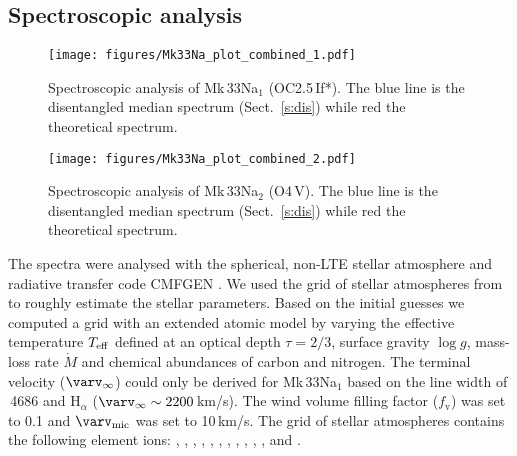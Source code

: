 \documentclass[fleqn,usenatbib]{mnras}
\begin{document}
\subsection{Spectroscopic analysis\label{s:sa}}

\begin{figure*}
	\texttt{[image: figures/Mk33Na\_plot\_combined\_1.pdf]}
    \caption{Spectroscopic analysis of Mk\,33Na$_1$ (OC2.5\,If*). The blue line is the disentangled median spectrum (Sect.~\ref{s:dis}) while red the theoretical spectrum.	\label{f:pri_dis}}
\end{figure*}

\begin{figure*}
	\texttt{[image: figures/Mk33Na\_plot\_combined\_2.pdf]}
    \caption{Spectroscopic analysis of Mk\,33Na$_2$ (O4\,V). The blue line is the disentangled median spectrum (Sect.~\ref{s:dis}) while red the theoretical spectrum.	\label{f:sec_dis}}
\end{figure*}


The spectra were analysed with the spherical, non-LTE stellar atmosphere and radiative transfer code CMFGEN \citep{hillier1998}. We used the grid of stellar atmospheres from \cite{bestenlehner2014} to roughly estimate the stellar parameters. Based on the initial guesses we computed a grid with an extended atomic model by varying the effective temperature $T_{\rm eff}$ defined at an optical depth $\tau = 2/3$, surface gravity $\log g$, mass-loss rate $\dot{M}$ and chemical abundances of carbon and nitrogen. The terminal velocity ($\varv_{\infty}$) could only be derived for Mk\,33Na$_1$ based on the line width of \,4686 and $\mathrm{H}_{\alpha}$ ($\varv_{\infty} \sim 2200$\,km/s). The wind volume filling factor ($f_{\mathrm{v}}$) was set to 0.1 and $\varv_{\rm mic}$ was set to 10\,km/s. The grid of stellar atmospheres contains the following element ions: , , , , , , , , , , ,  and .
\end{document}
